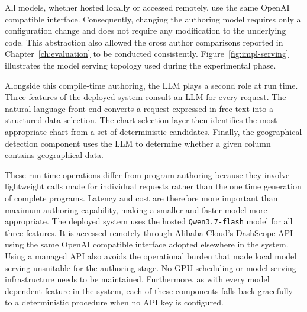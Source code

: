 All models, whether hosted locally or accessed remotely, use the same OpenAI compatible interface. Consequently, changing the authoring model requires only a configuration change and does not require any modification to the underlying code. This abstraction also allowed the cross author comparisons reported in Chapter~\ref{ch:evaluation} to be conducted consistently. Figure~\ref{fig:impl-serving} illustrates the model serving topology used during the experimental phase.



Alongside this compile-time authoring, the LLM plays a second role at run time. Three features of the deployed system consult an LLM for every request. The natural language front end converts a request expressed in free text into a structured data selection. The chart selection layer then identifies the most appropriate chart from a set of deterministic candidates. Finally, the geographical detection component uses the LLM to determine whether a given column contains geographical data.

These run time operations differ from program authoring because they involve lightweight calls made for individual requests rather than the one time generation of complete programs. Latency and cost are therefore more important than maximum authoring capability, making a smaller and faster model more appropriate. The deployed system uses the hosted \texttt{Qwen3.7-flash} model for all three features. It is accessed remotely through Alibaba Cloud's DashScope API using the same OpenAI compatible interface adopted elsewhere in the system. Using a managed API also avoids the operational burden that made local model serving unsuitable for the authoring stage. No GPU scheduling or model serving infrastructure needs to be maintained. Furthermore, as with every model dependent feature in the system, each of these components falls back gracefully to a deterministic procedure when no API key is configured.

\ifdefined\lstdefinestyle
\fi


